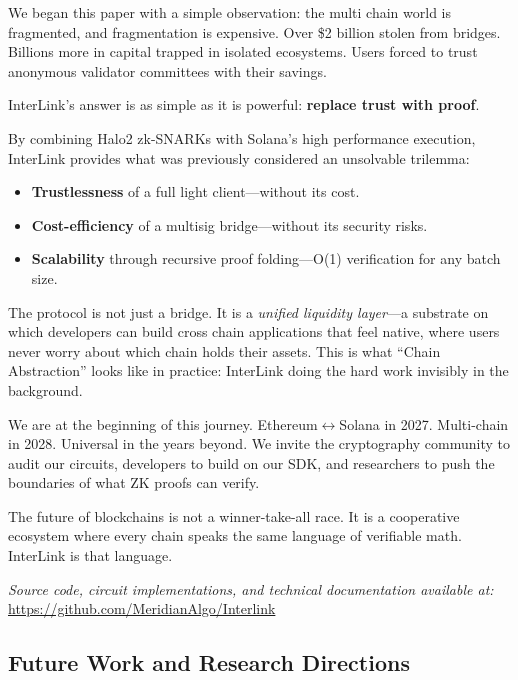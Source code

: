 \documentclass[11pt,a4paper]{article}
\begin{document}
We began this paper with a simple observation: the multi chain world is fragmented, and fragmentation is expensive. Over \$2 billion stolen from bridges. Billions more in capital trapped in isolated ecosystems. Users forced to trust anonymous validator committees with their savings.

InterLink's answer is as simple as it is powerful: \textbf{replace trust with proof}.

By combining Halo2 zk-SNARKs with Solana's high performance execution, InterLink provides what was previously considered an unsolvable trilemma:

\begin{itemize}
    \item \textbf{Trustlessness} of a full light client---without its cost.
    \item \textbf{Cost-efficiency} of a multisig bridge---without its security risks.
    \item \textbf{Scalability} through recursive proof folding---O(1) verification for any batch size.
\end{itemize}

The protocol is not just a bridge. It is a \textit{unified liquidity layer}---a substrate on which developers can build cross chain applications that feel native, where users never worry about which chain holds their assets. This is what ``Chain Abstraction'' looks like in practice: InterLink doing the hard work invisibly in the background.

We are at the beginning of this journey. Ethereum$\leftrightarrow$Solana in 2027. Multi-chain in 2028. Universal in the years beyond. We invite the cryptography community to audit our circuits, developers to build on our SDK, and researchers to push the boundaries of what ZK proofs can verify.

The future of blockchains is not a winner-take-all race. It is a cooperative ecosystem where every chain speaks the same language of verifiable math. InterLink is that language.

\vspace{0.3in}
\textit{Source code, circuit implementations, and technical documentation available at:}\\
\url{https://github.com/MeridianAlgo/Interlink}

\subsection{Future Work and Research Directions}
\end{document}
